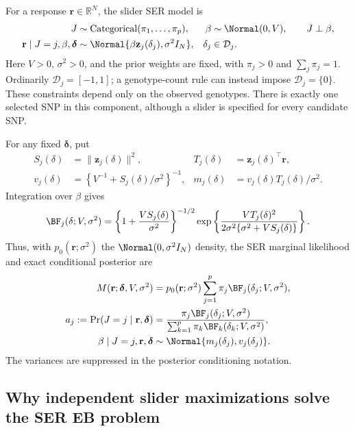 For a response $\mathbf r\in\mathbb R^N$, the slider SER model is
\begin{align}
J&\sim\operatorname{Categorical}(\pi_1,\ldots,\pi_p),
 &\beta&\sim\Normal(0,V),\qquad J\perp\beta,\nonumber\\
\mathbf r\mid J=j,\beta,\boldsymbol\delta
 &\sim\Normal\{\beta\mathbf z_j(\delta_j),\sigma^2 I_N\},
 &\delta_j&\in\mathcal D_j.
\label{eq:veb-ser-model}
\end{align}
Here $V>0$, $\sigma^2>0$, and the prior weights are fixed, with
$\pi_j>0$ and $\sum_j\pi_j=1$. Ordinarily
$\mathcal D_j=[-1,1]$; a genotype-count rule can instead impose
$\mathcal D_j=\{0\}$. These constraints depend only on the observed
genotypes. There is exactly one selected SNP in this component,
although a slider is specified for every candidate SNP.

For any fixed $\boldsymbol\delta$, put
\begin{align}
S_j(\delta)&=\|\mathbf z_j(\delta)\|^2,
 &T_j(\delta)&=\mathbf z_j(\delta)^\top\mathbf r,\nonumber\\
v_j(\delta)&=\left\{V^{-1}+S_j(\delta)/\sigma^2\right\}^{-1},
 &m_j(\delta)&=v_j(\delta)T_j(\delta)/\sigma^2.
\label{eq:veb-ser-moments}
\end{align}
Integration over $\beta$ gives
\begin{equation}
\BF_j(\delta;V,\sigma^2)
 =\left\{1+\frac{VS_j(\delta)}{\sigma^2}\right\}^{-1/2}
 \exp\left\{\frac{VT_j(\delta)^2}
 {2\sigma^2\{\sigma^2+VS_j(\delta)\}}\right\}.
\label{eq:veb-ser-bf}
\end{equation}
Thus, with $p_0(\mathbf r;\sigma^2)$ the $\Normal(0,\sigma^2 I_N)$
density, the SER marginal likelihood and exact conditional posterior
are
\begin{align}
M(\mathbf r;\boldsymbol\delta,V,\sigma^2)
 &=p_0(\mathbf r;\sigma^2)
   \sum_{j=1}^p\pi_j\BF_j(\delta_j;V,\sigma^2),
\label{eq:veb-ser-evidence}\\
a_j:=\Pr(J=j\mid\mathbf r,\boldsymbol\delta)
 &=\frac{\pi_j\BF_j(\delta_j;V,\sigma^2)}
 {\sum_{k=1}^p\pi_k\BF_k(\delta_k;V,\sigma^2)},
\label{eq:veb-ser-weights}\\
\beta\mid J=j,\mathbf r,\boldsymbol\delta
 &\sim\Normal\{m_j(\delta_j),v_j(\delta_j)\}.
\label{eq:veb-ser-posterior}
\end{align}
The variances are suppressed in the posterior conditioning notation.

\subsection{Why independent slider maximizations solve the SER EB problem}

